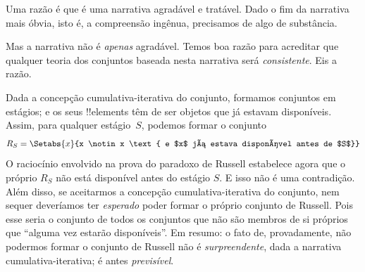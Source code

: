 \documentclass[../../../include/open-logic-section]{subfiles}
\begin{document}
Uma razão é que é uma narrativa agradável e tratável. Dado o fim da
narrativa mais óbvia, isto é, a compreensão ingênua, precisamos de
algo de substância.

Mas a narrativa não é \emph{apenas} agradável. Temos boa razão para
acreditar que qualquer teoria dos conjuntos baseada nesta narrativa será
\emph{consistente}. Eis a razão. 

Dada a concepção cumulativa-iterativa do conjunto, formamos conjuntos em
estágios; e os seus !!{element}s têm de ser objetos que já estavam
disponíveis. Assim, para qualquer estágio~$S$, podemos formar o conjunto 
\[
	R_S = \Setabs{x}{x \notin x \text{ e $x$ já estava disponível antes de $S$}}
\]
O raciocínio envolvido na prova do paradoxo de Russell estabelece agora
que o próprio $R_S$ não está disponível antes do estágio $S$. E isso não é uma
contradição. Além disso, se aceitarmos a concepção
cumulativa-iterativa do conjunto, nem sequer deveríamos ter \emph{esperado} poder
formar o próprio conjunto de Russell. Pois esse seria o conjunto de todos os
conjuntos que não são membros de si próprios que ``alguma vez estarão disponíveis''. Em resumo: o
 fato de, provadamente, não podermos formar o conjunto de Russell não é
\emph{surpreendente}, dada a narrativa cumulativa-iterativa; é antes
\emph{previsível}.

%

\end{document}
